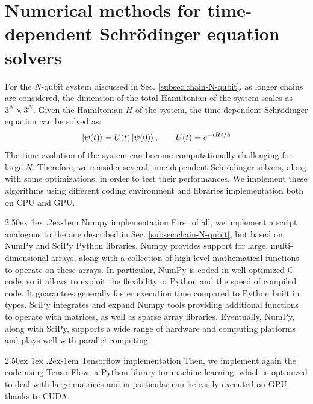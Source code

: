 \documentclass[rmp,10pt,onecolumn,fleqn,notitlepage]{revtex4-1}
\makeatletter
\renewcommand{\paragraph}{%
    \@startsection{paragraph}{4}%
    {\z@}{2.50ex \@plus 1ex \@minus .2ex}{-1em}%
    {\bf\sffamily}%
}
\makeatother
\begin{document}
\clearpage

\section{Numerical methods for time-dependent Schr{\"o}dinger equation solvers}
\label{sec:numerical_methods_time_evolution}
For the $N$-qubit system discussed in Sec. \ref{subsec:chain-N-qubit}, as longer chains are considered, the dimension of the total Hamiltonian of the system scales as $3^N \times 3^N$.
Given the Hamiltonian $H$ of the system, the time-dependent Schrödinger equation can be solved as:
\begin{equation}
    \left\vert{\psi(t)}\right\rangle = U(t) \left\vert{\psi(0)}\right\rangle, \qquad U(t)=e^{-iHt/\hbar}
    \label{eq:time-evolution}
\end{equation}
The time evolution of the system can become computationally challenging for large $N$.
Therefore, we consider several time-dependent Schr{\"o}dinger solvers, along with some optimizations, in order to test their performances. We implement these algorithms using different coding environment and libraries implementation both on CPU and GPU. 

\paragraph{Numpy implementation}
First of all, we implement a script analogous to the one described in Sec. \ref{subsec:chain-N-qubit}, but based on NumPy and SciPy Python libraries. Numpy provides support for large, multi-dimensional arrays, along with a collection of high-level mathematical functions to operate on these arrays. In particular, NumPy is coded in well-optimized C code, so it allows to exploit the flexibility of Python and the speed of compiled code. It guarantees generally faster execution time compared to Python built in types. SciPy integrates and expand Numpy tools providing additional functions to operate with matrices, as well as sparse array libraries. Eventually, NumPy, along with SciPy, supports a wide range of hardware and computing platforms and plays well with parallel computing. 

\paragraph{Tensorflow implementation} 
Then, we implement again the code using TensorFlow, a Python library for machine learning, which is optimized to deal with large matrices and in particular can be easily executed on GPU thanks to CUDA. 
\end{document}
